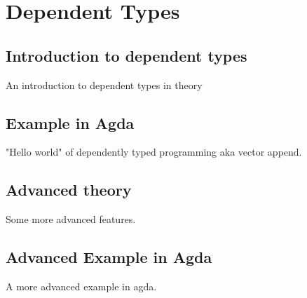 \section{Dependent Types}
\subsection{Introduction to dependent types}
An introduction to dependent types in theory
\subsection{Example in Agda}
"Hello world" of dependently typed programming aka vector append.
\subsection{Advanced theory}
Some more advanced features.
\subsection{Advanced Example in Agda}
A more advanced example in agda.
